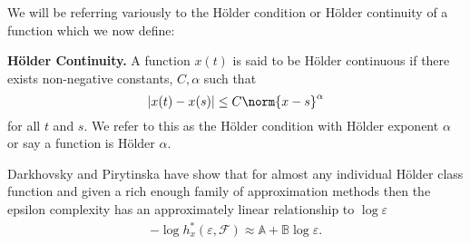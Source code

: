 \documentclass[11pt ]{article}
\begin{document}
  We will be referring variously to the H\"older condition or 
  H\"older continuity of a function which we now define:
  \begin{defn}{\textbf{H\"older Continuity.} }\label{def:holder}
    A function $x(t)$ is said to be H\"older continuous if
  there exists non-negative constants, $C, \alpha$ such that 
  \[
      |x(t) - x(s)| \leq C\norm{x -s}^{\alpha}
  \]
    for all $t$ and $s$.
  We refer to this as the H\"older condition with H\"older 
  exponent $\alpha$ or say a function is H\"older $\alpha$.
  \end{defn}
   Darkhovsky and Pirytinska have show that for almost any
  individual H\"older class function and given a rich 
  enough family of approximation methods  
  then the epsilon complexity has an approximately linear
  relationship to $\log \varepsilon$\cite{darkhovsky2013}
  \begin{align} \label{eq:linear-ecomplex}
      -\log h_x^*(\varepsilon, \mathcal{F}) \approx \mathbb{A} + 
    \mathbb{B}\log \varepsilon.  
  \end{align}
  
\end{document}

